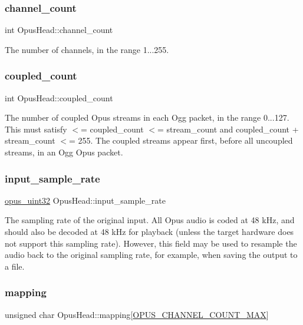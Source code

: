 \subsubsection{\texorpdfstring{channel\+\_\+count}{channel\_count}}
{\footnotesize\ttfamily int Opus\+Head\+::channel\+\_\+count}

The number of channels, in the range 1...255. \mbox{\label{struct_opus_head_a0b3e512ec24c989b0374358446197782}} 
\subsubsection{\texorpdfstring{coupled\+\_\+count}{coupled\_count}}
{\footnotesize\ttfamily int Opus\+Head\+::coupled\+\_\+count}

The number of coupled Opus streams in each Ogg packet, in the range 0...127. This must satisfy { $<$= coupled\+\_\+count $<$= stream\+\_\+count} and {\ttfamily coupled\+\_\+count + stream\+\_\+count $<$= 255}. The coupled streams appear first, before all uncoupled streams, in an Ogg Opus packet. \mbox{\label{struct_opus_head_a73b80a913eca33d829f1667caee80d9e}} 
\subsubsection{\texorpdfstring{input\+\_\+sample\+\_\+rate}{input\_sample\_rate}}
{\footnotesize\ttfamily \hyperlink{opus__types_8h_a643eaaadb9ef6cd44308e0299d8cd8ce}{opus\+\_\+uint32} Opus\+Head\+::input\+\_\+sample\+\_\+rate}

The sampling rate of the original input. All Opus audio is coded at 48 k\+Hz, and should also be decoded at 48 k\+Hz for playback (unless the target hardware does not support this sampling rate). However, this field may be used to resample the audio back to the original sampling rate, for example, when saving the output to a file. \mbox{\label{struct_opus_head_ac6372a8a1729b034308bae47253d94b7}} 
\subsubsection{\texorpdfstring{mapping}{mapping}}
{\footnotesize\ttfamily unsigned char Opus\+Head\+::mapping\mbox{[}\hyperlink{group__header__info_gad6f0329582430a828244045ac85a5417}{O\+P\+U\+S\+\_\+\+C\+H\+A\+N\+N\+E\+L\+\_\+\+C\+O\+U\+N\+T\+\_\+\+M\+AX}\mbox{]}}

